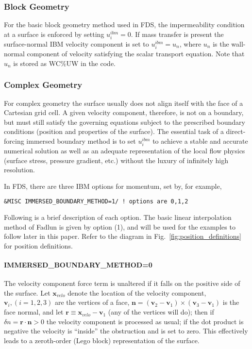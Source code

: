 \documentclass[12pt]{article}
\begin{document}
\subsubsection{Block Geometry}

For the basic block geometry method used in FDS, the impermeability condition at a surface is enforced by setting $u_i^{ibm} = 0$. If mass transfer is present the surface-normal IBM velocity component is set to $u_i^{ibm} = u_n$, where $u_n$ is the wall-normal component of velocity satisfying the scalar transport equation.  Note that $u_n$ is stored as {\ct WC\%UW} in the code.

\subsubsection{Complex Geometry}

For complex geometry the surface usually does not align itself with the face of a Cartesian grid cell. A given velocity component, therefore, is not on a boundary, but must still satisfy the governing equations subject to the prescribed boundary conditions (position and properties of the surface).  The essential task of a direct-forcing immersed boundary method is to set $u_i^{ibm}$ to achieve a stable and accurate numerical solution as well as an adequate representation of the local flow physics (surface stress, pressure gradient, etc.) without the luxury of infinitely high resolution.

In FDS, there are three IBM options for momentum, set by, for example,
\small
\begin{verbatim}
&MISC IMMERSED_BOUNDARY_METHOD=1/ ! options are 0,1,2
\end{verbatim}
\normalsize
Following is a brief description of each option. The basic linear interpolation method of Fadlun \cite{Fadlun:temp} is given by option (1), and will be used for the examples to follow later in this paper. Refer to the diagram in Fig.~\ref{fig:position_definitions} for position definitions.

\paragraph{\ct IMMERSED\_BOUNDARY\_METHOD=0}

The velocity component force term is unaltered if it falls on the positive side of the surface.  Let $\mathbf{x}_{velo}$ denote the location of the velocity component, $\mathbf{v}_i, (i=1,2,3)$ are the vertices of a face, $\mathbf{n} = (\mathbf{v}_2-\mathbf{v}_1) \times (\mathbf{v}_3-\mathbf{v}_1)$ is the face normal, and let $\mathbf{r} \equiv \mathbf{x}_{velo} - \mathbf{v}_1$ (any of the vertices will do); then if $\delta n =\mathbf{r} \cdot \mathbf{n} > 0$ the velocity component is processed as usual; if the dot product is negative the velocity is ``inside'' the obstruction and is set to zero.  This effectively leads to a zeroth-order (Lego block) representation of the surface.
\end{document}
